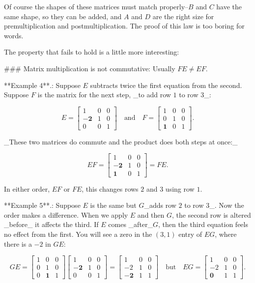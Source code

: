 Of course the shapes of these matrices must match properly--\(B\) and \(C\) have the same shape, so they can be added, and \(A\) and \(D\) are the right size for premultiplication and postmultiplication. The proof of this law is too boring for words.

The property that fails to hold is a little more interesting:

### Matrix multiplication is not commutative: Usually \(FE\neq EF\).

**Example 4**.: Suppose \(E\) subtracts twice the first equation from the second. Suppose \(F\) is the matrix for the next step, _to add row \(1\) to row \(3\)_:

\[E=\begin{bmatrix}1&0&0\\ -\mathbf{2}&1&0\\ 0&0&1\end{bmatrix}\quad\text{and}\quad F=\begin{bmatrix}1&0&0\\ 0&1&0\\ \mathbf{1}&0&1\end{bmatrix}.\]

_These two matrices do commute and the product does both steps at once:_

\[EF=\begin{bmatrix}1&0&0\\ -\mathbf{2}&1&0\\ \mathbf{1}&0&1\end{bmatrix}=FE.\]

In either order, \(EF\) or \(FE\), this changes rows \(2\) and \(3\) using row \(1\).

**Example 5**.: Suppose \(E\) is the same but \(G\)_adds row \(2\) to row \(3\)_. Now the order makes a difference. When we apply \(E\) and then \(G\), the second row is altered _before_ it affects the third. If \(E\) comes _after_\(G\), then the third equation feels no effect from the first. You will see a zero in the \((3,1)\) entry of \(EG\), where there is a \(-2\) in \(GE\):

\[GE=\begin{bmatrix}1&0&0\\ 0&1&0\\ 0&\mathbf{1}&1\end{bmatrix}\begin{bmatrix}1&0&0\\ -\mathbf{2}&1&0\\ 0&0&1\end{bmatrix}=\begin{bmatrix}1&0&0\\ -2&1&0\\ -\mathbf{2}&1&1\end{bmatrix}\quad\text{but}\quad EG=\begin{bmatrix}1&0&0\\ -2&1&0\\ \mathbf{0}&1&1\end{bmatrix}.\]

